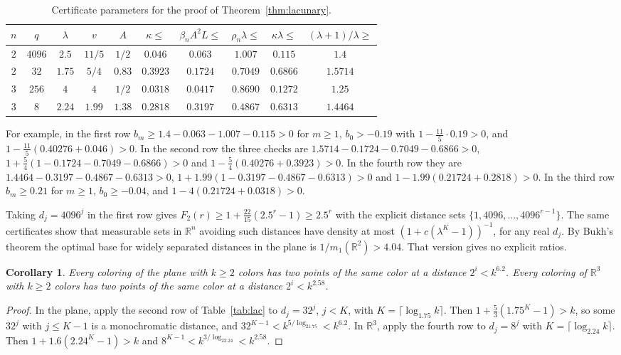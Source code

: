 \documentclass[11pt]{amsart}
\newtheorem{corollary}[theorem]{Corollary}
\theoremstyle{definition}
\newcommand{\R}{\mathbb{R}}
\begin{document}
\begin{table}[!ht]
\centering
\begin{tabular}{cccccccccc}
\toprule
$n$ & $q$ & $\lambda$ & $v$ & $A$ & $\kappa\le$ & $\beta_nA^2L\le$ & $\rho_n\lambda\le$ & $\kappa\lambda\le$ & $(\lambda+1)/\lambda\ge$\\
\midrule
$2$ & $4096$ & $2.5$ & $11/5$ & $1/2$ & $0.046$ & $0.063$ & $1.007$ & $0.115$ & $1.4$\\
$2$ & $32$ & $1.75$ & $5/4$ & $0.83$ & $0.3923$ & $0.1724$ & $0.7049$ & $0.6866$ & $1.5714$\\
$3$ & $256$ & $4$ & $4$ & $1/2$ & $0.0318$ & $0.0417$ & $0.8690$ & $0.1272$ & $1.25$\\
$3$ & $8$ & $2.24$ & $1.99$ & $1.38$ & $0.2818$ & $0.3197$ & $0.4867$ & $0.6313$ & $1.4464$\\
\bottomrule
\end{tabular}
\caption{Certificate parameters for the proof of Theorem~\ref{thm:lacunary}.}\label{tab:lacproof}
\end{table}

For example, in the first row $b_m\ge1.4-0.063-1.007-0.115>0$ for $m\ge1$, $b_0>-0.19$ with $1-\frac{11}{5}\cdot0.19>0$, and $1-\frac{11}{5}(0.40276+0.046)>0$. In the second row the three checks are $1.5714-0.1724-0.7049-0.6866>0$, $1+\frac54(1-0.1724-0.7049-0.6866)>0$ and $1-\frac54(0.40276+0.3923)>0$. In the fourth row they are $1.4464-0.3197-0.4867-0.6313>0$, $1+1.99(1-0.3197-0.4867-0.6313)>0$ and $1-1.99(0.21724+0.2818)>0$. In the third row $b_m\ge0.21$ for $m\ge1$, $b_0\ge-0.04$, and $1-4(0.21724+0.0318)>0$.

Taking $d_j=4096^j$ in the first row gives $F_2(r)\ge1+\frac{22}{15}(2.5^r-1)\ge2.5^r$ with the explicit distance sets $\{1,4096,\dots,4096^{r-1}\}$. The same certificates show that measurable sets in $\R^n$ avoiding such distances have density at most $(1+c(\lambda^K-1))^{-1}$, for any real $d_j$. By Bukh's theorem the optimal base for widely separated distances in the plane is $1/m_1(\R^2)>4.04$. That version gives no explicit ratios.

\begin{corollary}\label{cor:soifer}
Every coloring of the plane with $k\ge2$ colors has two points of the same color at a distance $2^i<k^{6.2}$. Every coloring of $\R^3$ with $k\ge2$ colors has two points of the same color at a distance $2^i<k^{2.58}$.
\end{corollary}

\begin{proof}
In the plane, apply the second row of Table~\ref{tab:lac} to $d_j=32^j$, $j<K$, with $K=\lceil\log_{1.75}k\rceil$. Then $1+\frac53(1.75^K-1)>k$, so some $32^j$ with $j\le K-1$ is a monochromatic distance, and $32^{K-1}<k^{5/\log_21.75}<k^{6.2}$. In $\R^3$, apply the fourth row to $d_j=8^j$ with $K=\lceil\log_{2.24}k\rceil$. Then $1+1.6(2.24^K-1)>k$ and $8^{K-1}<k^{3/\log_22.24}<k^{2.58}$.
\end{proof}
\end{document}
